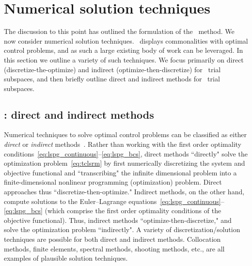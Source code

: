 \section{Numerical solution techniques}\label{sec:numerical_techniques}
The discussion to this point has outlined the formulation of the \methodAcronym\ method. We now consider numerical solution techniques. 
\methodAcronym\ displays commonalities with optimal
control problems, and as such a large existing body of work can be leveraged. In this section we 
outline a variety of such techniques. We focus primarily on 
direct (discretize-the-optimize) and indirect (optimize-then-discretize) for \spatialAcronym\ trial subspaces, 
and then briefly outline direct and indirect methods for \spaceTimeAcronym\ trial subspaces. 

\subsection{\spatialAcronym: direct and indirect methods}
Numerical techniques to
solve optimal control problems can be classified as either
\textit{direct} or \textit{indirect}
methods~\cite{conway_optimalcontrolreview}. Rather than working with the first order optimality conditions~\eqref{eq:lspg_continuous}--\eqref{eq:lspg_bcs}, direct methods ``directly" solve the optimization problem~\eqref{eq:tclsrm} by first
numerically discretizing the system and objective functional and ``transcribing"
the infinite dimensional problem into a finite-dimensional nonlinear
programming (optimization) problem. Direct approaches thus ``discretize-then-optimize."
Indirect methods, on the other hand, compute solutions to the Euler--Lagrange equations~\eqref{eq:lspg_continuous}--\eqref{eq:lspg_bcs} (which comprise the first order optimality conditions of the objective functional). Thus, indirect methods ``optimize-then-discretize," and solve the optimization problem
``indirectly". A variety of discretization/solution techniques are possible for both direct and indirect methods. Collocation methods,
finite elements, spectral methods, shooting methods, etc., are all examples of
plausible solution techniques.  

